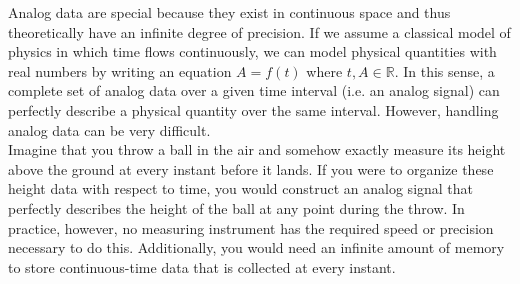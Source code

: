 \begin{center}
\end{center}

Analog data are special because they exist in continuous space and thus theoretically have an infinite degree of precision. If we assume a classical model of physics in which time flows continuously, we can model physical quantities with real numbers by writing an equation $A=f(t)$ where $t,A\in\mathbb{R}$. In this sense, a complete set of analog data over a given time interval (i.e. an analog signal) can perfectly describe a physical quantity over the same interval. However, handling analog data can be very difficult. \\

Imagine that you throw a ball in the air and somehow exactly measure its height above the ground at every instant before it lands. If you were to organize these height data with respect to time, you would construct an analog signal that perfectly describes the height of the ball at any point during the throw. In practice, however, no measuring instrument has the required speed or precision necessary to do this. Additionally, you would need an infinite amount of memory to store continuous-time data that is collected at every instant. \\\\


